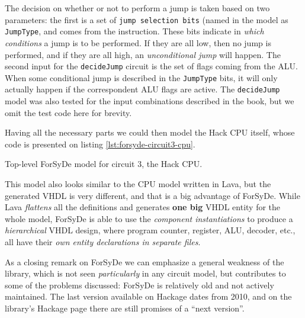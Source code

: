             The decision on whether or not to perform a jump is taken based on two parameters: the
            first is a set of \texttt{jump selection bits} (named in the model as \texttt{JumpType},
            and comes from the instruction. These bits indicate in \emph{which conditions} a jump is
            to be performed. If they are all low, then no jump is performed, and if they are all
            high, an \emph{unconditional jump} will happen.  The second input for the
            \texttt{decideJump} circuit is the set of flags coming from the ALU. When some
            conditional jump is described in the \texttt{JumpType} bits, it will only actually
            happen if the correspondent ALU flags are active. The \texttt{decideJump} model was also
            tested for the input combinations described in the book\cite{nand2tetris-book}, but we
            omit the test code here for brevity.

            Having all the necessary parts we could then model the Hack CPU itself, whose code is
            presented on listing \ref{lst:forsyde-circuit3-cpu}.

            \begin{listing}[h!]
                \caption{Top-level ForSyDe model for circuit 3, the Hack CPU.
                    \label{lst:forsyde-circuit3-cpu}}
            \end{listing}

            This model also looks similar to the CPU model written in Lava, but the generated VHDL
            is very different, and that is a big advantage of ForSyDe. While Lava \emph{flattens}
            all the definitions and generates \textbf{one big} VHDL entity for the whole model,
            ForSyDe is able to use the \emph{component instantiations} to produce a
            \emph{hierarchical} VHDL design, where program counter, register, ALU, decoder, etc.,
            all have their \emph{own entity declarations in separate files}.

            As a closing remark on ForSyDe we can emphasize a general weakness of the library, which
            is not seen \emph{particularly} in any circuit model, but contributes to some of the
            problems discussed: ForSyDe is relatively old and not actively maintained. The last
            version available on Hackage\cite{website:forsyde-hackage} dates from 2010, and on the
            library's Hackage page there are still promises of a ``next version''.

